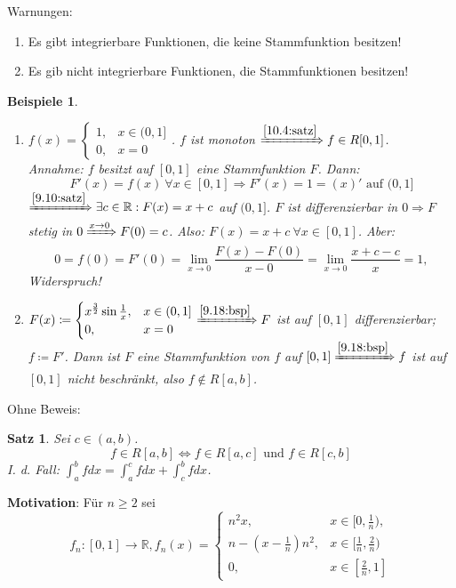 \documentclass[titlepage,ngerman,a4paper,headsepline]{scrartcl}
\newcommand{\R}{\mathbb{R}}
\theoremstyle{named}
\theoremstyle{dotless}
\newtheorem{satz}[namedtheorem]{Satz}
\newtheorem*{beispiele}{Beispiele}
\begin{document}
Warnungen:
\begin{enumerate}
	\item Es gibt integrierbare Funktionen, die keine Stammfunktion besitzen!
	\item Es gib nicht integrierbare Funktionen, die Stammfunktionen besitzen!
\end{enumerate}

\begin{beispiele} ~\
	\begin{enumerate}
		\item $f(x) = \begin{cases} 1, & x \in (0, 1] \\ 0, & x = 0 \end{cases}$. %
			$f$ ist monoton $\xRightarrow[]{\ref{10.4:satz}} f \in R[0, 1]$. \\
			Annahme: $f$ besitzt auf $[0, 1]$ eine Stammfunktion $F$. Dann:
			$$ F'(x) = f(x) ~\forall x \in [0, 1] \Rightarrow F'(x) = 1 = (x)' \text{ auf } (0, 1] $$
			$\xRightarrow[]{\ref{9.10:satz}} \exists c \in \R: F(x) = x + c$ auf $(0, 1]$. $F$ ist differenzierbar in $0 \Rightarrow F$ stetig in $0 \xRightarrow[]{x \rightarrow 0} F(0) = c$. Also: $F(x) = x + c ~\forall x \in [0, 1]$. Aber:
			$$ 0 = f(0) = F'(0) = \lim_{x \rightarrow 0} \frac{F(x) - F(0)}{x - 0} = \lim_{x \rightarrow 0} \frac{x + c - c}{x} = 1, $$
			Widerspruch!
		\item $F(x) \coloneqq \begin{cases} x^{\frac{3}{2}} \sin \frac{1}{x}, & x \in (0, 1] \\ 0, & x = 0 \end{cases} \xRightarrow[]{\ref{9.18:bsp}} F$ ist auf $[0, 1]$ differenzierbar; $f \coloneqq F'$. Dann ist $F$ eine Stammfunktion von $f$ auf $[0, 1] \xRightarrow[]{\ref{9.18:bsp}} f$ ist auf $[0, 1]$ nicht beschränkt, also $f \notin R[a, b]$. 
	\end{enumerate}	
\end{beispiele}

Ohne Beweis:

\begin{satz} \label{10.7:satz}
	Sei $c \in (a, b)$.
	$$  f \in R[a, b] \iff f \in R[a, c] \text{ und } f \in R[c, b] $$	
	I. d. Fall: $\int_{a}^{b} f dx = \int_{a}^{c} f dx + \int_{c}^{b} f dx$. %
\end{satz}


\textbf{Motivation}: Für $n \geq 2$ sei 
	$$f_{n} \colon [0, 1] \rightarrow \R, f_{n}(x) = \begin{cases} n^{2} x, & x \in [0, \frac{1}{n}), \\ n - (x - \frac{1}{n}) n^{2}, & x \in [\frac{1}{n}, \frac{2}{n}) \\ 0, & x \in [\frac{2}{n}, 1] \end{cases} $$
\end{document}
